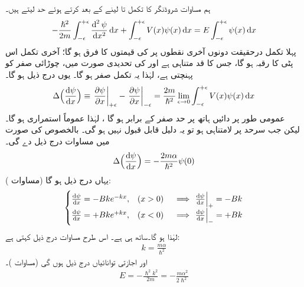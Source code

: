 ہم مساوات شروڈنگر کا تکمل    تا   لینے کے بعد  کرتے ہوئے حد لیتے ہیں۔
\begin{align}
-\frac{\hslash^2}{2m}\int_{-\epsilon}^{+\epsilon}\frac{\dif^{\,2}\psi}{\dif x^2}\dif x+\int_{-\epsilon}^{+\epsilon}V(x)\psi(x)\dif x=E\int_{-\epsilon}^{+\epsilon}\psi(x)\dif x
\end{align}
پہلا تکمل درحقیقت دونوں آخری نقطوں  پر  کی قیمتوں کا  فرق ہو گا؛ آخری تکمل اس پٹی کا رقبہ ہو گا، جس کا قد متناہی ہے  اور  کی تحدیدی صورت میں، چوڑائی صفر کو پہنچتی ہے، لہٰذا یہ تکمل صفر ہو گا۔ یوں درج ذیل ہو گا۔
\begin{align}
\Delta\Big(\frac{\dif\psi}{\dif x}\Big)\equiv \left.\frac{\partial \psi}{\partial x}\right|_{+\epsilon}-\left.\frac{\partial \psi}{\partial x}\right|_{-\epsilon}=\frac{2m}{\hslash^2}\lim_{\epsilon\to0}\int_{-\epsilon}^{+\epsilon}V(x)\psi(x)\dif x
\end{align}
 عمومی طور پر دائیں ہاتھ پر حد صفر کے برابر ہو گا ، لہٰذا  عموماً استمراری ہو گا۔ لیکن جب سرحد پر  لامتناہی ہو تو یہ دلیل قابل قبول نہیں ہو گی۔ بالخصوص  کی صورت میں مساوات  درج ذیل دے گی۔
\begin{align}\label{مساوات_شروڈنگر_مبدا_پر_تفرقات_کا_فرق}
\Delta\Big(\frac{\dif \psi}{\dif x}\Big)=-\frac{2m\alpha}{\hslash^2}\psi(0)
\end{align}
یہاں درج ذیل ہو گا (مساوات ):
\begin{align*}
\begin{cases}
\frac{\dif \psi}{\dif x}=-Bke^{-kx},&(x>0)\quad \implies \left.\frac{\dif\psi}{\dif x}\right|_{+}=-Bk\\
\frac{\dif \psi}{\dif x}=+Bke^{+kx},&(x<0)\quad \implies \left.\frac{\dif\psi}{\dif x}\right|_{-}=+Bk
\end{cases}
\end{align*}
لہٰذا  ہو گا۔ساتھ ہی  ہے۔ اس طرح مساوات  درج ذیل کہتی ہے:
\begin{align}
k=\frac{m\alpha}{\hslash^2}
\end{align}
اور اجازتی توانائیاں درج ذیل ہوں گی (مساوات )۔
\begin{align}
E=-\frac{\hslash^2 k^2}{2m}=-\frac{m\alpha^2}{2\hslash^2}
\end{align}
